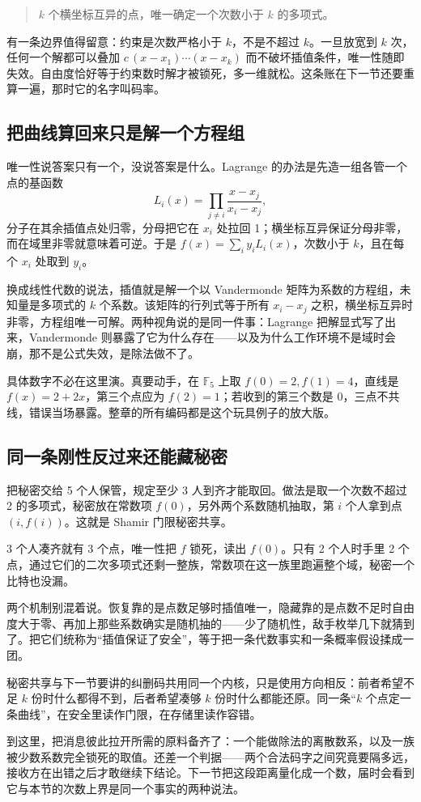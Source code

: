 \begin{quote}
\(k\) 个横坐标互异的点，唯一确定一个次数小于 \(k\) 的多项式。
\end{quote}

有一条边界值得留意：约束是次数严格小于 \(k\)，不是不超过 \(k\)。一旦放宽到 \(k\) 次，任何一个解都可以叠加 \(c\,(x-x_1)\cdots(x-x_k)\) 而不破坏插值条件，唯一性随即失效。自由度恰好等于约束数时解才被锁死，多一维就松。这条账在下一节还要重算一遍，那时它的名字叫码率。

\subsection{把曲线算回来只是解一个方程组}

唯一性说答案只有一个，没说答案是什么。Lagrange 的办法是先造一组各管一个点的基函数
\[
L_i(x)=\prod_{j\neq i}\frac{x-x_j}{x_i-x_j},
\]
分子在其余插值点处归零，分母把它在 \(x_i\) 处拉回 1；横坐标互异保证分母非零，而在域里非零就意味着可逆。于是 \(f(x)=\sum_i y_i L_i(x)\)，次数小于 \(k\)，且在每个 \(x_i\) 处取到 \(y_i\)。

换成线性代数的说法，插值就是解一个以 Vandermonde 矩阵为系数的方程组，未知量是多项式的 \(k\) 个系数。该矩阵的行列式等于所有 \(x_i-x_j\) 之积，横坐标互异时非零，方程组唯一可解。两种视角说的是同一件事：Lagrange 把解显式写了出来，Vandermonde 则暴露了它为什么存在——以及为什么工作环境不是域时会崩，那不是公式失效，是除法做不了。

具体数字不必在这里演。真要动手，在 \(\mathbb F_5\) 上取 \(f(0)=2,f(1)=4\)，直线是 \(f(x)=2+2x\)，第三个点应为 \(f(2)=1\)；若收到的第三个数是 0，三点不共线，错误当场暴露。整章的所有编码都是这个玩具例子的放大版。

\subsection{同一条刚性反过来还能藏秘密}

把秘密交给 5 个人保管，规定至少 3 人到齐才能取回。做法是取一个次数不超过 2 的多项式，秘密放在常数项 \(f(0)\)，另外两个系数随机抽取，第 \(i\) 个人拿到点 \((i,f(i))\)。这就是 Shamir 门限秘密共享。

3 个人凑齐就有 3 个点，唯一性把 \(f\) 锁死，读出 \(f(0)\)。只有 2 个人时手里 2 个点，通过它们的二次多项式还剩一整族，常数项在这一族里跑遍整个域，秘密一个比特也没漏。

两个机制别混着说。恢复靠的是点数足够时插值唯一，隐藏靠的是点数不足时自由度大于零、再加上那些系数确实是随机抽的——少了随机性，敌手枚举几下就猜到了。把它们统称为``插值保证了安全''，等于把一条代数事实和一条概率假设揉成一团。

秘密共享与下一节要讲的纠删码共用同一个内核，只是使用方向相反：前者希望不足 \(k\) 份时什么都得不到，后者希望凑够 \(k\) 份时什么都能还原。同一条``\(k\) 个点定一条曲线''，在安全里读作门限，在存储里读作容错。

到这里，把消息彼此拉开所需的原料备齐了：一个能做除法的离散数系，以及一族被少数系数完全锁死的取值。还差一个判据——两个合法码字之间究竟要隔多远，接收方在出错之后才敢继续下结论。下一节把这段距离量化成一个数，届时会看到它与本节的次数上界是同一个事实的两种说法。
